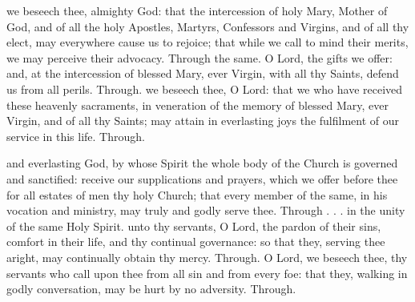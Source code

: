 \begin{multicols}{2}
 we beseech thee, almighty God: that the intercession of holy Mary, Mother of God, and of all the holy Apostles, Martyrs, Confessors and Virgins, and of all thy elect, may everywhere cause us to rejoice; that while we call to mind their merits, we may perceive their advocacy. Through the same.
 O Lord, the gifts we offer: and, at the intercession of blessed Mary, ever Virgin, with all thy Saints, defend us from all perils. Through.
 we beseech thee, O Lord: that we who have received these heavenly sacraments, in veneration of the memory of blessed Mary, ever Virgin, and of all thy Saints; may attain in everlasting joys the fulfilment of our service in this life. Through.

%

 and everlasting God, by whose Spirit the whole body of the Church is governed and sanctified: receive our supplications and prayers, which we offer before thee for all estates of men thy holy Church; that every member of the same, in his vocation and ministry, may truly and godly serve thee. Through . . . in the unity of the same Holy Spirit.
 unto thy servants, O Lord, the pardon of their sins, comfort in their life, and thy continual governance: so that they, serving thee aright, may continually obtain thy mercy. Through.
\postcommunion
{} O Lord, we beseech thee, thy servants who call upon thee from all sin and from every foe: that they, walking in godly conversation, may be hurt by no adversity. Through.


\end{multicols}
